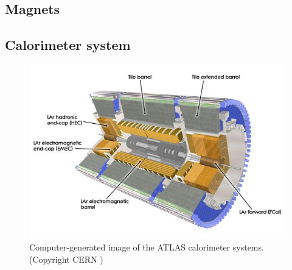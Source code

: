 \subsection{Magnets}
\label{subsec:atlas_magnet}

\cite{ATLAS:1997ae} %

\subsection{Calorimeter system}
\label{sec:atlas:calo}

\begin{figure}[t]
\includegraphics{calorimeter.jpg}
\caption{Computer-generated image of the ATLAS calorimeter systems. (Copyright CERN \cite{Pequenao:1095927})}
\label{fig:atlas_calorimeter}
\end{figure}

\cite{ATLAS:1996aa} %
\cite{ATLAS:1996ab} %
\cite{Airapetian:1996iv} %

